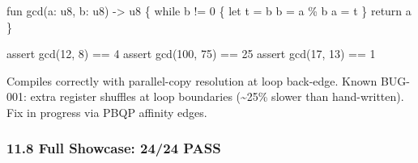 \documentclass[
  11pt,
]{article}
\newenvironment{Shaded}{}{}
\newcommand{\NormalTok}[1]{#1}
\begin{document}
\begin{Shaded}
\begin{Highlighting}[]
\NormalTok{fun gcd(a: u8, b: u8) {-}\textgreater{} u8 \{}
\NormalTok{    while b != 0 \{}
\NormalTok{        let t = b}
\NormalTok{        b = a \% b}
\NormalTok{        a = t}
\NormalTok{    \}}
\NormalTok{    return a}
\NormalTok{\}}

\NormalTok{assert gcd(12, 8) == 4}
\NormalTok{assert gcd(100, 75) == 25}
\NormalTok{assert gcd(17, 13) == 1}
\end{Highlighting}
\end{Shaded}

Compiles correctly with parallel-copy resolution at loop back-edge.
Known BUG-001: extra register shuffles at loop boundaries
(\textasciitilde25\% slower than hand-written). Fix in progress via PBQP
affinity edges.

\subsubsection{11.8 Full Showcase: 24/24
PASS}\label{full-showcase-2424-pass}
\end{document}
